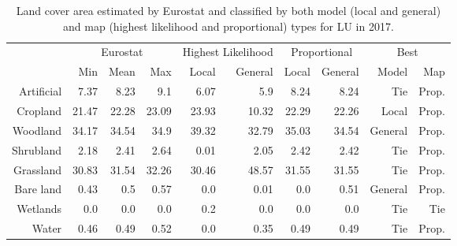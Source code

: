 \begin{table}[H]
\centering
\caption{Land cover area estimated by Eurostat and classified by both model (local and general) and map (highest likelihood and proportional) types for LU in 2017.}

\begin{tabular}{r|rrr|rr|rr|rr}
\toprule
{} & \multicolumn{3}{|c}{Eurostat} & \multicolumn{2}{|c}{Highest Likelihood} & \multicolumn{2}{|c}{Proportional} & \multicolumn{2}{|c}{Best} \\
{} &      Min &   Mean &    Max &              Local & General &        Local & General &    Model &    Map \\
\midrule
Artificial &     7.37 &   8.23 &    9.1 &               6.07 &     5.9 &         8.24 &    8.24 &      Tie &  Prop. \\
Cropland   &    21.47 &  22.28 &  23.09 &              23.93 &   10.32 &        22.29 &   22.26 &    Local &  Prop. \\
Woodland   &    34.17 &  34.54 &   34.9 &              39.32 &   32.79 &        35.03 &   34.54 &  General &  Prop. \\
Shrubland  &     2.18 &   2.41 &   2.64 &               0.01 &    2.05 &         2.42 &    2.42 &      Tie &  Prop. \\
Grassland  &    30.83 &  31.54 &  32.26 &              30.46 &   48.57 &        31.55 &   31.55 &      Tie &  Prop. \\
Bare land  &     0.43 &    0.5 &   0.57 &                0.0 &    0.01 &          0.0 &    0.51 &  General &  Prop. \\
Wetlands   &      0.0 &    0.0 &    0.0 &                0.2 &     0.0 &          0.0 &     0.0 &      Tie &    Tie \\
Water      &     0.46 &   0.49 &   0.52 &                0.0 &    0.35 &         0.49 &    0.49 &      Tie &  Prop. \\
\bottomrule
\end{tabular}
\end{table}

